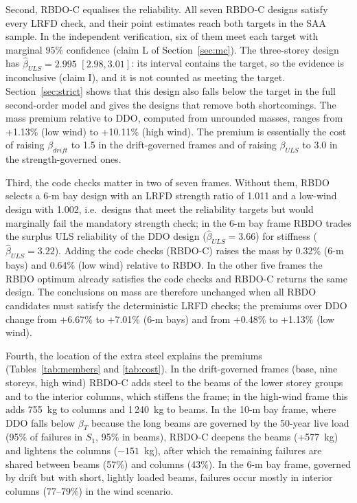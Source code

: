 Second, RBDO-C equalises the reliability. All seven RBDO-C designs satisfy every LRFD check, and
their point estimates reach both targets in the SAA sample. In the independent verification, six of
them meet each target with marginal $95\%$ confidence (claim L of Section~\ref{sec:mc}). The three-storey
design has $\hat\beta_{ULS}=2.995$ $[2.98, 3.01]$: its interval contains the target, so the evidence
is inconclusive (claim I), and it is not counted as meeting the target. Section~\ref{sec:strict}
shows that this design also falls below the target in the full second-order model and gives
the designs that remove both shortcomings.
The mass premium relative to DDO, computed from unrounded masses, ranges from +1.13\% (low wind)
to +10.11\% (high wind). The premium is essentially the cost of raising $\beta_{drift}$ to 1.5 in
the drift-governed frames and of raising $\beta_{ULS}$ to 3.0 in the strength-governed ones.

Third, the code checks matter in two of seven frames. Without them, RBDO selects a 6-m bay design
with an LRFD strength ratio of 1.011 and a low-wind design with 1.002, i.e.\ designs that meet the
reliability targets but would marginally fail the mandatory strength check; in the 6-m bay frame
RBDO trades the surplus ULS reliability of the DDO design ($\hat\beta_{ULS}=3.66$) for stiffness
($\hat\beta_{ULS}=3.22$). Adding the code checks (RBDO-C) raises the mass by 0.32\% (6-m bays) and
0.64\% (low wind) relative to RBDO. In the other five frames the RBDO optimum already satisfies the
code checks and RBDO-C returns the same design. The conclusions on mass are therefore unchanged
when all RBDO candidates must satisfy the deterministic LRFD checks; the premiums over DDO change
from +6.67\% to +7.01\% (6-m bays) and from +0.48\% to +1.13\% (low wind).

Fourth, the location of the extra steel explains the premiums (Tables~\ref{tab:members} and
\ref{tab:cost}). In the drift-governed frames (base, nine storeys, high wind) RBDO-C adds steel to
the beams of the lower storey groups and to the interior columns, which stiffens the frame; in the
high-wind frame this adds 755~kg to columns and 1\,240~kg to beams. In the 10-m bay frame, where
DDO falls below $\beta_T$ because the long beams are governed by the 50-year live load (95\% of
failures in $S_1$, 95\% in beams), RBDO-C deepens the beams (+577~kg) and lightens the columns
($-151$~kg), after which the remaining failures are shared between beams (57\%) and columns
(43\%). In the 6-m bay frame, governed by drift but with short, lightly loaded beams, failures occur
mostly in interior columns (77--79\%) in the wind scenario.


